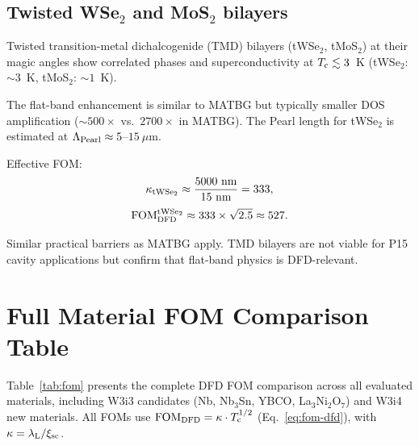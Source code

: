 \documentclass[11pt]{article}
\newcommand{\lambdaL}{\lambda_{\rm L}}
\newcommand{\xsc}{\xi_{\rm sc}}
\newcommand{\Tc}{T_{\rm c}}
\newcommand{\FOM}{\mathrm{FOM}}
\begin{document}
\subsection{Twisted WSe$_2$ and MoS$_2$ bilayers}

Twisted transition-metal dichalcogenide (TMD) bilayers (tWSe$_2$, tMoS$_2$)
at their magic angles show correlated phases and superconductivity at
$\Tc \lesssim 3$~K (tWSe$_2$: $\sim 3$~K, tMoS$_2$: $\sim 1$~K).

The flat-band enhancement is similar to MATBG but typically smaller DOS
amplification ($\sim 500\times$ vs.\ $2700\times$ in MATBG). The Pearl
length for tWSe$_2$ is estimated at $\Lambda_{\rm Pearl} \approx 5$--$15~\mu$m.

Effective FOM:
\begin{equation}
\kappa_{\rm tWSe_2} \approx \frac{5000~\text{nm}}{15~\text{nm}} = 333,
\end{equation}
\begin{equation}
\FOM_{\rm DFD}^{\rm tWSe_2}
\approx 333 \times \sqrt{2.5}
\approx 527.
\end{equation}

Similar practical barriers as MATBG apply. TMD bilayers are not viable for
P15 cavity applications but confirm that flat-band physics is DFD-relevant.

\section{Full Material FOM Comparison Table}
\label{sec:table}

Table~\ref{tab:fom} presents the complete DFD FOM comparison across all
evaluated materials, including W3i3 candidates (Nb, Nb$_3$Sn, YBCO,
La$_3$Ni$_2$O$_7$) and W3i4 new materials. All FOMs use
$\FOM_{\rm DFD} = \kappa \cdot \Tc^{1/2}$ (Eq.~\ref{eq:fom-dfd}), with
$\kappa = \lambdaL / \xsc$.
\end{document}
